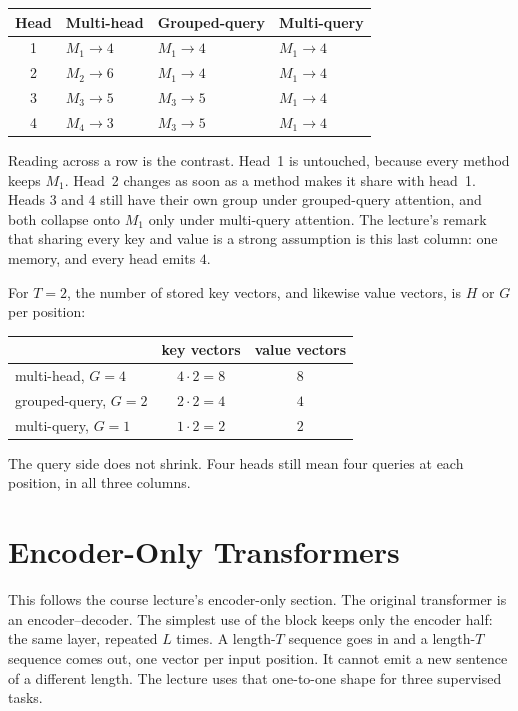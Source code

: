 \documentclass[11pt]{article}
\begin{document}
\begin{center}
\small
\begin{tabular}{@{}clll@{}}
\toprule
Head & Multi-head & Grouped-query & Multi-query \\
\midrule
1 & \(M_1\to 4\) & \(M_1\to 4\) & \(M_1\to 4\) \\
2 & \(M_2\to 6\) & \(M_1\to 4\) & \(M_1\to 4\) \\
3 & \(M_3\to 5\) & \(M_3\to 5\) & \(M_1\to 4\) \\
4 & \(M_4\to 3\) & \(M_3\to 5\) & \(M_1\to 4\) \\
\bottomrule
\end{tabular}
\end{center}

Reading across a row is the contrast. Head~1 is untouched, because every
method keeps \(M_1\). Head~2 changes as soon as a method makes it share
with head~1. Heads \(3\) and \(4\) still have their own group under
grouped-query attention, and both collapse onto \(M_1\) only under
multi-query attention. The lecture's remark that sharing every key and
value is a strong assumption is this last column: one memory, and every
head emits \(4\).

For \(T=2\), the number of stored key vectors, and likewise value vectors,
is \(H\) or \(G\) per position:
\begin{center}
\begin{tabular}{@{}lcc@{}}
\toprule
 & key vectors & value vectors \\
\midrule
multi-head, \(G=4\) & \(4\cdot 2=8\) & \(8\) \\
grouped-query, \(G=2\) & \(2\cdot 2=4\) & \(4\) \\
multi-query, \(G=1\) & \(1\cdot 2=2\) & \(2\) \\
\bottomrule
\end{tabular}
\end{center}
The query side does not shrink. Four heads still mean four queries at each
position, in all three columns.

\section{Encoder-Only Transformers}
\label{sec:encoder-only}

This follows the course lecture's encoder-only section. The original
transformer is an encoder--decoder. The simplest use of the block keeps
only the encoder half: the same layer, repeated \(L\) times. A length-\(T\)
sequence goes in and a length-\(T\) sequence comes out, one vector per input
position. It cannot emit a new sentence of a different length. The lecture
uses that one-to-one shape for three supervised tasks.
\end{document}
